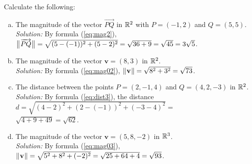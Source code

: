 \begin{exmp}
 Calculate the following:
 \begin{enumerate}[(a)]
  \item The magnitude of the vector $\overrightarrow{PQ}$ in $\mathbb{R}^{2}$ with $P = (-1,2)$ and
   $Q = (5,5)$.\\\emph{Solution:} By formula (\ref{eq:mag2}), $\bigl\lVert\mspace{1mu}\overrightarrow{PQ}\mspace{1mu}\bigr\rVert =
   \sqrt{(5 - (-1))^2 + (5 - 2)^2} = \sqrt{36 + 9} = \sqrt{45} = 3 \sqrt{5}$.
  \item The magnitude of the vector $\mathbf{v} = (8,3)$ in $\mathbb{R}^{2}$.\\\emph{Solution:} By formula
   (\ref{eq:mag02}), $\lVert\mspace{1mu}\mathbf{v}\mspace{1mu}\rVert = \sqrt{8^2 + 3^2} = \sqrt{73}$.
  \item The distance between the points $P = (2, -1, 4)$ and $Q = (4, 2, -3)$ in $\mathbb{R}^{2}$.\\\emph{Solution:}
   By formula (\ref{eq:dist3}), the distance $d = \sqrt{(4 - 2)^2 + (2 - (-1))^2 + (-3 - 4)^2} =$\\$\sqrt{4 + 9 + 49} =
   \sqrt{62}$.
  \item The magnitude of the vector $\mathbf{v} = (5,8,-2)$ in $\mathbb{R}^{3}$.\\\emph{Solution:} By formula
   (\ref{eq:mag03}), $\lVert\mspace{1mu}\mathbf{v}\mspace{1mu}\rVert = \sqrt{5^2 + 8^2 + (-2)^2} = \sqrt{25 + 64 + 4} = \sqrt{93}$.
 \end{enumerate}
\end{exmp}
\startexercises\label{sec1dot1}
